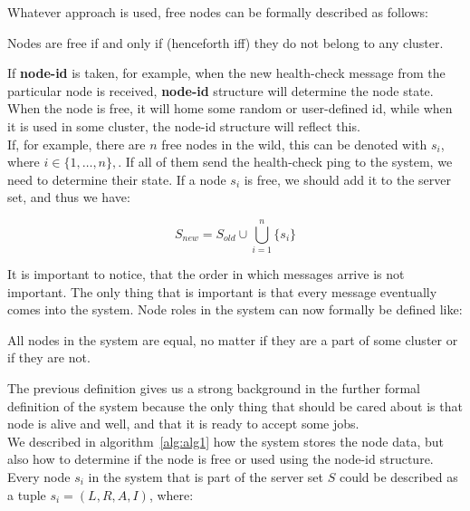 Whatever approach is used, free nodes can be formally described as follows:

\begin{definition}
	Nodes are free if and only if (henceforth iff) they do not belong to any cluster.
\end{definition}

\noindent 
If \textbf{node-id} is taken, for example, when the new health-check message from the particular node is received, \textbf{node-id} structure will determine the node state. When the node is free, it will home some random or user-defined id, while when it is used in some cluster, the node-id structure will reflect this.\\

If, for example, there are $n$ free nodes in the wild, this can be denoted with $s_i$, where $i\in\{1, \ldots, n\},$. If all of them send the health-check ping to the system, we need to determine their state. If a node $s_i$ is free, we should add it to the server set, and thus we have:

\begin{equation}
	S_{\mathit{new}} = S_{\mathit{old}} \cup \bigcup%
	_{i=1}^{n} \{s_i\}
\end{equation}
 
\noindent 
It is important to notice, that the order in which messages arrive is not important. The only thing that is important is that every message eventually comes into the system. Node roles in the system can now formally be defined like:

\begin{definition}
	All nodes in the system are equal, no matter if they are a part of some cluster or if they are not.
\end{definition}

\noindent
The previous definition gives us a strong background in the further formal definition of the system because the only thing that should be cared about is that node is alive and well, and that it is ready to accept some jobs.\\

We described in algorithm~\ref{alg:alg1} how the system stores the node data, but also how to determine if the node is free or used using the node-id structure. Every node $s_i$ in the system that is part of the server set $S$ could be described as a tuple $s_i = (L, R, A, I)$, where:

